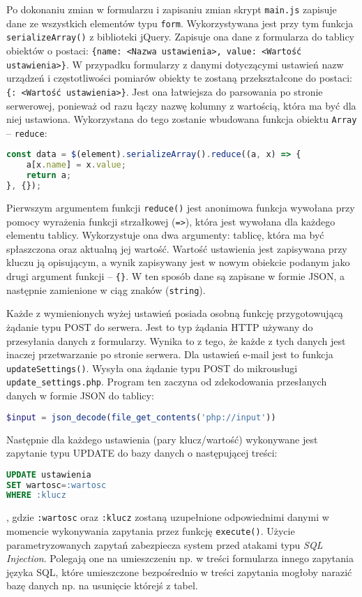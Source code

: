 \documentclass[a4paper,11pt,twoside]{article}
\begin{document}
Po dokonaniu zmian w formularzu i zapisaniu zmian skrypt \texttt{main.js} zapisuje dane ze wszystkich elementów typu \texttt{form}. Wykorzystywana jest przy tym funkcja \texttt{serializeArray()} z biblioteki jQuery. Zapisuje ona dane z formularza do tablicy obiektów o postaci: \texttt{\{name: <Nazwa ustawienia>, value: <Wartość ustawienia>\}}. W przypadku formularzy z danymi dotyczącymi ustawień nazw urządzeń i częstotliwości pomiarów obiekty te zostaną przekształcone do postaci: \texttt{\{<Nazwa ustawienia>: <Wartość ustawienia>\}}. Jest ona łatwiejsza do parsowania po stronie serwerowej, ponieważ od razu łączy nazwę kolumny z wartością, która ma być dla niej ustawiona. Wykorzystana do tego zostanie wbudowana funkcja obiektu \texttt{Array} -- \texttt{reduce}:
\begin{lstlisting}[language=JavaScript]
const data = $(element).serializeArray().reduce((a, x) => {
	a[x.name] = x.value;
	return a;
}, {});
\end{lstlisting}
Pierwszym argumentem funkcji \texttt{reduce()} jest anonimowa funkcja wywołana przy pomocy wyrażenia funkcji strzałkowej (\texttt{=>}), która jest wywołana dla każdego elementu tablicy. Wykorzystuje ona dwa argumenty: tablicę, która ma być spłaszczona oraz aktualną jej wartość. Wartość ustawienia jest zapisywana przy kluczu ją opisującym, a wynik zapisywany jest w nowym obiekcie podanym jako drugi argument funkcji -- \texttt{\{\}}. W ten sposób dane są zapisane w formie JSON, a następnie zamienione w ciąg znaków (\texttt{string}).

Każde z wymienionych wyżej ustawień posiada osobną funkcję przygotowującą żądanie typu POST do serwera. Jest to typ żądania HTTP używany do przesyłania danych z formularzy.\cite{http} Wynika to z tego, że każde z tych danych jest inaczej przetwarzanie po stronie serwera. Dla ustawień e-mail jest to funkcja \texttt{updateSettings()}. Wysyła ona żądanie typu POST do mikrousługi \texttt{update{\_}settings.php}. Program ten zaczyna od zdekodowania przesłanych danych w formie JSON do tablicy:
\begin{lstlisting}[language=PHP]
$input = json_decode(file_get_contents('php://input'))
\end{lstlisting}
Następnie dla każdego ustawienia (pary klucz/wartość) wykonywane jest zapytanie typu UPDATE do bazy danych o następującej treści:
\begin{lstlisting}[language=SQL]
UPDATE ustawienia 
SET wartosc=:wartosc
WHERE :klucz
\end{lstlisting}
, gdzie \texttt{:wartosc} oraz \texttt{:klucz} zostaną uzupełnione odpowiednimi danymi w momencie wykonywania zapytania przez funkcję \texttt{execute()}. Użycie parametryzowanych zapytań zabezpiecza system przed atakami typu \textit{SQL Injection}. Polegają one na umieszczeniu np. w treści formularza innego zapytania języka SQL, które umieszczone bezpośrednio w treści zapytania mogłoby narazić bazę danych np. na usunięcie którejś z tabel.\cite{sql-injection}
\end{document}
